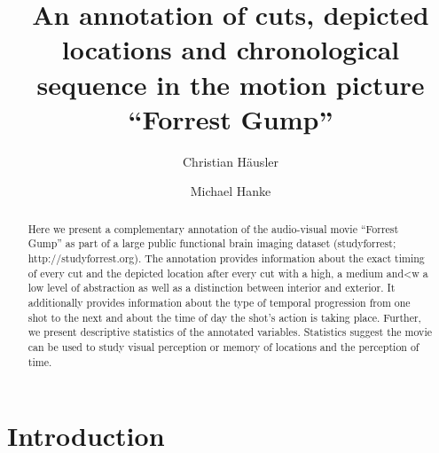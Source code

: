 \documentclass[10pt,a4paper,twocolumn]{article}
\begin{document}


\title{An annotation of cuts, depicted locations and chronological sequence in the motion
	picture ``Forrest Gump''}

\author[1]{Christian Häusler}
\author[1,2]{Michael Hanke}

\maketitle
\thispagestyle{fancy}

\begin{abstract}
Here we present a complementary annotation of the audio-visual movie “Forrest
Gump” as part of a large public functional brain imaging dataset
(studyforrest; http://studyforrest.org). The annotation provides information
about the exact timing of every cut and the depicted location after every
cut with a high, a medium and<w a low level of abstraction as well as a
distinction between interior and exterior. It additionally provides
information about the type of temporal progression from one shot to the
next and about the time of day the shot’s action is taking place.
Further, we present descriptive statistics of the annotated variables.
Statistics suggest the movie can be used to study visual perception or memory
of locations and the perception of time.

\end{abstract}


\clearpage


\section*{Introduction}
\end{document}
